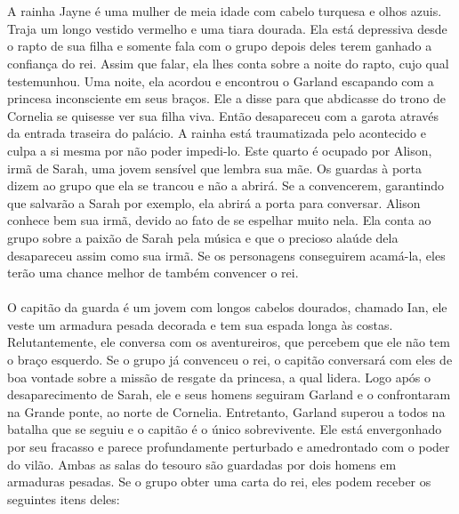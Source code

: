 %
\vfill
%
\\\\
%
 A rainha Jayne é uma mulher de meia idade com cabelo turquesa e olhos azuis. Traja um longo vestido vermelho e uma tiara dourada. 
Ela está depressiva desde o rapto de sua filha e somente fala com o grupo depois deles terem ganhado a confiança do rei.
Assim que falar, ela lhes conta sobre a noite do rapto, cujo qual testemunhou.
Uma noite, ela acordou e encontrou o Garland escapando com a princesa inconsciente em seus braços.
Ele a disse para que abdicasse do trono de Cornelia se quisesse ver sua filha viva. Então desapareceu com a garota através da entrada traseira do palácio.
A rainha está traumatizada pelo acontecido e culpa a si mesma por não poder impedi-lo.
%
\ofpar
%
 Este quarto é ocupado por Alison, irmã de Sarah, uma jovem sensível que lembra sua mãe. 
Os guardas à porta dizem ao grupo que ela se trancou e não a abrirá.
Se a convencerem, garantindo que salvarão a Sarah por exemplo, ela abrirá a porta para conversar.
Alison conhece bem sua irmã, devido ao fato de se espelhar muito nela.
Ela conta ao grupo sobre a paixão de Sarah pela música e que o precioso alaúde dela desapareceu assim como sua irmã.
Se os personagens conseguirem acamá-la, eles terão uma chance melhor de também convencer o rei.
%
\clearpage
%
\\\\
%
 O capitão da guarda é um jovem com longos cabelos dourados, chamado Ian, ele veste um armadura pesada decorada e tem sua espada longa às costas.
Relutantemente, ele conversa com os aventureiros, que percebem que ele não tem o braço esquerdo.
Se o grupo já convenceu o rei, o capitão conversará com eles de boa vontade sobre a missão de resgate da princesa, a qual lidera.
Logo após o desaparecimento de Sarah, ele e seus homens seguiram Garland e o confrontaram na Grande ponte, ao norte de Cornelia.
Entretanto, Garland superou a todos na batalha que se seguiu e o capitão é o único sobrevivente.
Ele está envergonhado por seu fracasso e parece profundamente perturbado e amedrontado com o poder do vilão.
%
\ofpar
%
Ambas as salas do tesouro são guardadas por dois homens em armaduras pesadas. Se o grupo obter uma carta do rei, eles podem receber os seguintes itens deles:
